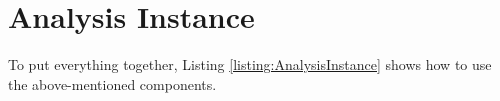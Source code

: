		\setJavaCodeListing
		

	\section{Analysis Instance}

		To put everything together, Listing \ref{listing:AnalysisInstance} shows how to use the above-mentioned components.

		\setJavaCodeListing
		
